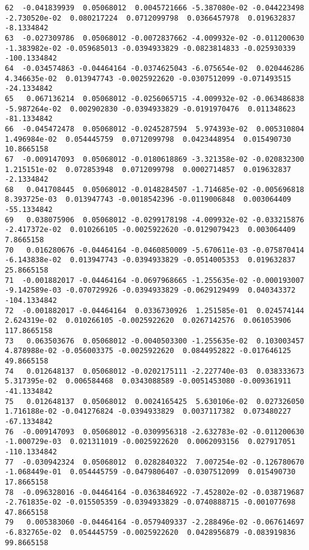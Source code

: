 \documentclass[15pt,a4paper,openright]{article}
\begin{document}
\begin{lstlisting}[language=AMPL, caption = data file]
62  -0.041839939  0.05068012  0.0045721666 -5.387080e-02 -0.044223498 -2.730520e-02  0.080217224  0.0712099798  0.0366457978  0.019632837   -8.1334842
63  -0.027309786  0.05068012 -0.0072837662 -4.009932e-02 -0.011200630 -1.383982e-02 -0.059685013 -0.0394933829 -0.0823814833 -0.025930339 -100.1334842
64  -0.034574863 -0.04464164 -0.0374625043 -6.075654e-02  0.020446286  4.346635e-02  0.013947743 -0.0025922620 -0.0307512099 -0.071493515  -24.1334842
65   0.067136214  0.05068012 -0.0256065715 -4.009932e-02 -0.063486838 -5.987264e-02  0.002902830 -0.0394933829 -0.0191970476  0.011348623  -81.1334842
66  -0.045472478  0.05068012 -0.0245287594  5.974393e-02  0.005310804  1.496984e-02  0.054445759  0.0712099798  0.0423448954  0.015490730   10.8665158
67  -0.009147093  0.05068012 -0.0180618869 -3.321358e-02 -0.020832300  1.215151e-02  0.072853948  0.0712099798  0.0002714857  0.019632837   -2.1334842
68   0.041708445  0.05068012 -0.0148284507 -1.714685e-02 -0.005696818  8.393725e-03  0.013947743 -0.0018542396 -0.0119006848  0.003064409  -55.1334842
69   0.038075906  0.05068012 -0.0299178198 -4.009932e-02 -0.033215876 -2.417372e-02  0.010266105 -0.0025922620 -0.0129079423  0.003064409    7.8665158
70   0.016280676 -0.04464164 -0.0460850009 -5.670611e-03 -0.075870414 -6.143838e-02  0.013947743 -0.0394933829 -0.0514005353  0.019632837   25.8665158
71  -0.001882017 -0.04464164 -0.0697968665 -1.255635e-02 -0.000193007 -9.142589e-03 -0.070729926 -0.0394933829 -0.0629129499  0.040343372 -104.1334842
72  -0.001882017 -0.04464164  0.0336730926  1.251585e-01  0.024574144  2.624319e-02  0.010266105 -0.0025922620  0.0267142576  0.061053906  117.8665158
73   0.063503676  0.05068012 -0.0040503300 -1.255635e-02  0.103003457  4.878988e-02 -0.056003375 -0.0025922620  0.0844952822 -0.017646125   49.8665158
74   0.012648137  0.05068012 -0.0202175111 -2.227740e-03  0.038333673  5.317395e-02  0.006584468  0.0343088589 -0.0051453080 -0.009361911  -41.1334842
75   0.012648137  0.05068012  0.0024165425  5.630106e-02  0.027326050  1.716188e-02 -0.041276824 -0.0394933829  0.0037117382  0.073480227  -67.1334842
76  -0.009147093  0.05068012 -0.0309956318 -2.632783e-02 -0.011200630 -1.000729e-03  0.021311019 -0.0025922620  0.0062093156  0.027917051 -110.1334842
77  -0.030942324  0.05068012  0.0282840322  7.007254e-02 -0.126780670 -1.068449e-01  0.054445759 -0.0479806407 -0.0307512099  0.015490730   17.8665158
78  -0.096328016 -0.04464164 -0.0363846922 -7.452802e-02 -0.038719687 -2.761835e-02 -0.015505359 -0.0394933829 -0.0740888715 -0.001077698   47.8665158
79   0.005383060 -0.04464164 -0.0579409337 -2.288496e-02 -0.067614697 -6.832765e-02  0.054445759 -0.0025922620  0.0428956879 -0.083919836   99.8665158

\end{lstlisting}
\end{document}

